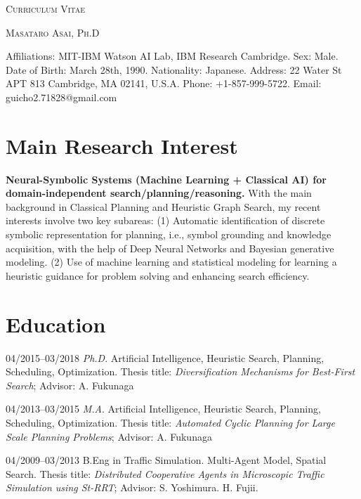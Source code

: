 


\pagestyle{empty}

\begin{center}
{\huge\textsc{Curriculum Vitae}}
\vspace{0.7\baselineskip}

{\Large\textsc{Masataro Asai, Ph.D}}
\vspace{0.5\baselineskip}

\small

 Affiliations: MIT-IBM Watson AI Lab, IBM Research Cambridge.
 Sex: Male. Date of Birth: March 28th, 1990. Nationality: Japanese.
 Address: 22 Water St APT 813 Cambridge, MA 02141, U.S.A.
 Phone: +1-857-999-5722.
 Email: guicho2.71828@gmail.com
\end{center}

\section{Main Research Interest}

\textbf{Neural-Symbolic Systems (Machine Learning + Classical AI) for domain-independent search/planning/reasoning.}
With the main background in Classical Planning and
Heuristic Graph Search, my recent interests involve two key subareas:
(1) Automatic identification of discrete symbolic representation for planning, i.e.,
symbol grounding and knowledge acquisition, with the help of Deep Neural Networks and Bayesian generative modeling.
(2) Use of machine learning and statistical modeling for learning a heuristic guidance for problem solving and enhancing search efficiency.


\section{Education}

\begin{CV}
 \item[04/2015--03/2018] \textit{Ph.D}.
 Artificial Intelligence, Heuristic Search, Planning, Scheduling, Optimization.
 Thesis title: \emph{Diversification Mechanisms for Best-First Search};
 Advisor: A. Fukunaga

 \item[04/2013--03/2015] \textit{M.A}.
 Artificial Intelligence, Heuristic Search, Planning, Scheduling, Optimization.
 Thesis title: \emph{Automated Cyclic Planning for Large Scale Planning Problems};
 Advisor: A. Fukunaga

 \item[04/2009--03/2013] B.Eng in Traffic Simulation.
 Multi-Agent Model, Spatial Search.
 Thesis title: \emph{Distributed Cooperative Agents in Microscopic Traffic Simulation using St-RRT};
 Advisor: S. Yoshimura. H. Fujii.
\end{CV}



